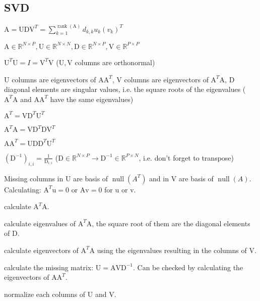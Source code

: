 \documentclass[a4paper, 11pt, landscape]{article}
\newcommand{\matr}[1]{\boldsymbol{\mathrm{#1}}}
\begin{document}
\begin{multicols*}{3}
\section{SVD}
\begin{compactitem}
	\item $\matr{A} = \matr{U} \matr{D} \matr{V}^T = \sum_{k=1}^{\operatorname{rank}(\matr{A})} d_{k,k} u_k (v_k)^T$
	\item $\matr{A} \in \mathbb{R}^{N \times P}, \matr{U} \in \mathbb{R}^{N \times N}, \matr{D} \in \mathbb{R}^{N \times P}, \matr{V} \in \mathbb{R}^{P \times P}$
	\item $\matr{U}^T \matr{U} = I = \matr{V}^T \matr{V}$ ($\matr{U}, \matr{V}$ columns are orthonormal)
	\item $\matr{U}$ columns are eigenvectors of $\matr{A} \matr{A}^T$, $\matr{V}$ columns are eigenvectors of $\matr{A}^T \matr{A}$, $\matr{D}$ diagonal elements are singular values, i.e. the square roots of the eigenvalues ($\matr{A}^T \matr{A}$ and $\matr{A} \matr{A}^T$ have the same eigenvalues)
	\begin{listcols}
		\item $\matr{A}^T = \matr{V} \matr{D}^T \matr{U}^T$
		\item $\matr{A}^T \matr{A} = \matr{V} \matr{D}^T \matr{D} \matr{V}^T$
		\item $\matr{A} \matr{A}^T = \matr{U} \matr{D} \matr{D}^T \matr{U}^T$
	\end{listcols}
	\item $(\matr{D}^{-1})_{i,i} = \frac{1}{\matr{D}_{i, i}}$ ($\matr{D} \in \mathbb{R}^{N \times P} \to \matr{D}^{-1} \in \mathbb{R}^{P \times N}$, i.e. don't forget to transpose)
	\item Missing columns in $\matr{U}$ are basis of $\operatorname{null}(A^T)$ and in $\matr{V}$ are basis of $\operatorname{null}(A)$. Calculating: $\matr{A}^T \matr{u} = \matr{0}$ or $\matr{A} \matr{v} = \matr{0}$ for $\matr{u}$ or $\matr{v}$.
\end{compactitem}

\begin{compactenum}
	\item calculate $\matr{A}^T \matr{A}$.
	\item calculate eigenvalues of $\matr{A}^T \matr{A}$, the square root of them are the diagonal elements of $\matr{D}$.
	\item calculate eigenvectors of $\matr{A}^T \matr{A}$ using the eigenvalues resulting in the columns of $\matr{V}$.
	\item calculate the missing matrix: $\matr{U} = \matr{A} \matr{V} \matr{D}^{-1}$. Can be checked by calculating the eigenvectors of $\matr{A} \matr{A}^T$.
	\item normalize each columns of $\matr{U}$ and $\matr{V}$.
\end{compactenum}


\end{multicols*}
\end{document}
